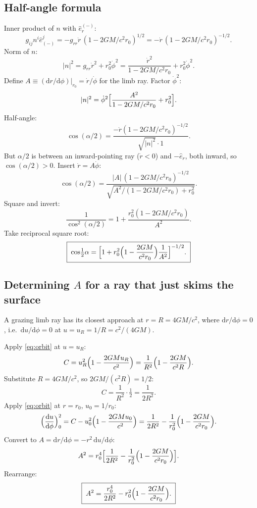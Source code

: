 \documentclass[11pt]{article}
\newcommand{\de}{\mathrm{d}}
\begin{document}
\subsection*{Half-angle formula}

Inner product of $n$ with $\hat e_{r}^{(-)}$:
\[ g_{ij}n^{i}\hat e^{j}_{(-)} = -g_{rr}\dot r\,(1-2GM/c^{2}r_{0})^{1/2} = -\dot r\,(1-2GM/c^{2}r_{0})^{-1/2}. \]
Norm of $n$:
\[ |n|^{2} = g_{rr}\dot r^{2}+r_{0}^{2}\dot\phi^{2} = \frac{\dot r^{2}}{1-2GM/c^{2}r_{0}} + r_{0}^{2}\dot\phi^{2}. \]
Define $A\equiv (\de r/\de\phi)|_{r_{0}}=\dot r/\dot\phi$ for the limb ray. Factor $\dot\phi^{2}$:
\[ |n|^{2} = \dot\phi^{2}\Bigl[\frac{A^{2}}{1-2GM/c^{2}r_{0}} + r_{0}^{2}\Bigr]. \]
Half-angle:
\[ \cos(\alpha/2) = \frac{-\dot r(1-2GM/c^{2}r_{0})^{-1/2}}{\sqrt{|n|^{2}}\cdot 1}. \]
But $\alpha/2$ is between an inward-pointing ray ($\dot r<0$) and $-\hat e_{r}$, both inward, so $\cos(\alpha/2)>0$. Insert $\dot r=A\dot\phi$:
\[ \cos(\alpha/2) = \frac{|A|\,(1-2GM/c^{2}r_{0})^{-1/2}}{\sqrt{A^{2}/(1-2GM/c^{2}r_{0}) + r_{0}^{2}}}. \]
Square and invert:
\[ \frac{1}{\cos^{2}(\alpha/2)} = 1 + \frac{r_{0}^{2}(1-2GM/c^{2}r_{0})}{A^{2}}. \]
Take reciprocal square root:
\[ \boxed{\;\cos\!\tfrac12\alpha = \Bigl[1 + r_{0}^{2}\Bigl(1-\frac{2GM}{c^{2}r_{0}}\Bigr)\frac{1}{A^{2}}\Bigr]^{-1/2}.\;}\label{eq:alpha} \]

\subsection*{Determining $A$ for a ray that just skims the surface}

A grazing limb ray has its closest approach at $r=R=4GM/c^{2}$, where $\de r/\de\phi=0$, i.e.\ $\de u/\de\phi=0$ at $u=u_{R}=1/R=c^{2}/(4GM)$.

Apply \eqref{eq:orbit} at $u=u_{R}$:
\[ C = u_{R}^{2}\Bigl(1-\frac{2GM u_{R}}{c^{2}}\Bigr) = \frac{1}{R^{2}}\Bigl(1-\frac{2GM}{c^{2}R}\Bigr). \]
Substitute $R=4GM/c^{2}$, so $2GM/(c^{2}R)=1/2$:
\[ C = \frac{1}{R^{2}}\cdot\tfrac12 = \frac{1}{2R^{2}}. \]
Apply \eqref{eq:orbit} at $r=r_{0}$, $u_{0}=1/r_{0}$:
\[ \Bigl(\frac{\de u}{\de\phi}\Bigr)_{0}^{2} = C - u_{0}^{2}\Bigl(1-\frac{2GM u_{0}}{c^{2}}\Bigr) = \frac{1}{2R^{2}} - \frac{1}{r_{0}^{2}}\Bigl(1-\frac{2GM}{c^{2}r_{0}}\Bigr). \]
Convert to $A=\de r/\de\phi=-r^{2}\,\de u/\de\phi$:
\[ A^{2} = r_{0}^{4}\Bigl[\frac{1}{2R^{2}} - \frac{1}{r_{0}^{2}}\Bigl(1-\frac{2GM}{c^{2}r_{0}}\Bigr)\Bigr]. \]
Rearrange:
\[ \boxed{\;A^{2} = \frac{r_{0}^{4}}{2R^{2}} - r_{0}^{2}\Bigl(1-\frac{2GM}{c^{2}r_{0}}\Bigr).\;}\label{eq:Asq} \]
\end{document}
